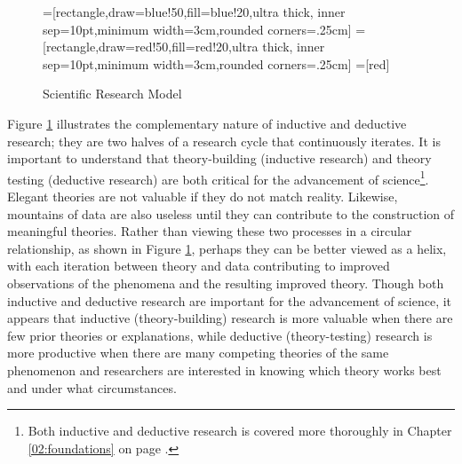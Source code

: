 \begin{center}
	\begin{figure}[H]
		=[rectangle,draw=blue!50,fill=blue!20,ultra thick,
			inner sep=10pt,minimum width=3cm,rounded corners=.25cm]
		=[rectangle,draw=red!50,fill=red!20,ultra thick,
			inner sep=10pt,minimum width=3cm,rounded corners=.25cm]
		=[red]
		\caption{Scientific Research Model}
		\label{01.fig05}
	\end{figure}
\end{center}

Figure \ref{01.fig05} illustrates the complementary nature of inductive and deductive research; they are two halves of a research cycle that continuously iterates. It is important to understand that theory-building (inductive research) and theory testing (deductive research) are both critical for the advancement of science\footnote{Both inductive and deductive research is covered more thoroughly in Chapter \ref{02:foundations} on page \pageref{02:foundations}.}. Elegant theories are not valuable if they do not match reality. Likewise, mountains of data are also useless until they can contribute to the construction of meaningful theories. Rather than viewing these two processes in a circular relationship, as shown in Figure \ref{01.fig05}, perhaps they can be better viewed as a helix, with each iteration between theory and data contributing to improved observations of the phenomena and the resulting improved theory. Though both inductive and deductive research are important for the advancement of science, it appears that inductive (theory-building) research is more valuable when there are few prior theories or explanations, while deductive (theory-testing) research is more productive when there are many competing theories of the same phenomenon and researchers are interested in knowing which theory works best and under what circumstances.

